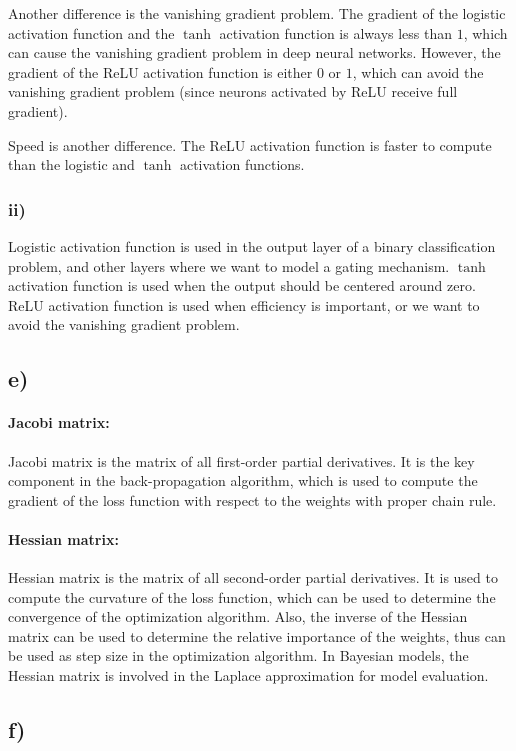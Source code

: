 \documentclass[a4paper,12pt]{article}
\begin{document}
Another difference is the vanishing gradient problem. The gradient of the logistic activation function and the $\tanh$ activation function is always less than $1$, which can cause the vanishing gradient problem in deep neural networks. However, the gradient of the ReLU activation function is either $0$ or $1$, which can avoid the vanishing gradient problem (since neurons activated by ReLU receive full gradient).

Speed is another difference. The ReLU activation function is faster to compute than the logistic and $\tanh$ activation functions.

\subsubsection*{ii)}
Logistic activation function is used in the output layer of a binary classification problem, and other layers where we want to model a gating mechanism. $\tanh$ activation function is used when the output should be centered around zero. ReLU activation function is used when efficiency is important, or we want to avoid the vanishing gradient problem.

\subsection*{e)}

\paragraph{Jacobi matrix:}
Jacobi matrix is the matrix of all first-order partial derivatives. It is the key component in the back-propagation algorithm, which is used to compute the gradient of the loss function with respect to the weights with proper chain rule.

\paragraph{Hessian matrix:}
Hessian matrix is the matrix of all second-order partial derivatives. It is used to compute the curvature of the loss function, which can be used to determine the convergence of the optimization algorithm. Also, the inverse of the Hessian matrix can be used to determine the relative importance of the weights, thus can be used as step size in the optimization algorithm. In Bayesian models, the Hessian matrix is involved in the Laplace approximation for model evaluation.

\subsection*{f)}
\end{document}
